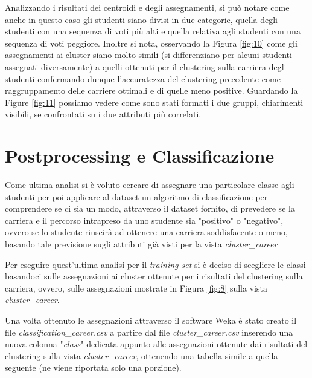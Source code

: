 \documentclass[]{article}
\begin{document}
Analizzando i risultati dei centroidi e degli assegnamenti, si pu\`{o} notare come anche in questo caso gli studenti siano divisi in due categorie, quella degli studenti con una sequenza di voti pi\`{u} alti e quella relativa agli studenti con una sequenza di voti peggiore. Inoltre si nota, osservando la Figura \ref{fig:10} come gli assegnamenti ai cluster siano molto simili (si differenziano per alcuni studenti assegnati diversamente) a quelli ottenuti per il clustering sulla carriera degli studenti confermando dunque l'accuratezza del clustering precedente come raggruppamento delle carriere ottimali e di quelle meno positive. Guardando la Figure \ref{fig:11} possiamo vedere come sono stati formati i due gruppi, chiarimenti visibili, se confrontati su i due attributi pi\`{u} correlati.

\section{Postprocessing e Classificazione}

Come ultima analisi si \`{e} voluto cercare di assegnare una particolare classe agli studenti per poi applicare al dataset un algoritmo di classificazione per comprendere se ci sia un modo, attraverso il dataset fornito, di prevedere se la carriera e il percorso intrapreso da uno studente sia "positivo" o "negativo", ovvero se lo studente riuscir\`{a} ad ottenere una carriera soddisfacente o meno, basando tale previsione sugli attributi gi\`{a} visti per la vista \textit{cluster\_career}

Per eseguire quest'ultima analisi per il \textit{training set} si \`{e} deciso di scegliere le classi basandoci sulle assegnazioni ai cluster ottenute per i risultati del clustering sulla carriera, ovvero, sulle assegnazioni mostrate in Figura \ref{fig:8} sulla vista \textit{cluster\_career}.

Una volta ottenuto le assegnazioni attraverso il software Weka \`{e} stato creato il file \textit{classification\_career.csv} a partire dal file \textit{cluster\_career.csv} inserendo una nuova colonna "\textit{class}" dedicata appunto alle assegnazioni ottenute dai risultati del clustering sulla vista \textit{cluster\_career}, ottenendo una tabella simile a quella seguente (ne viene riportata solo una porzione).

\begin{center}
\end{center}
\end{document}
